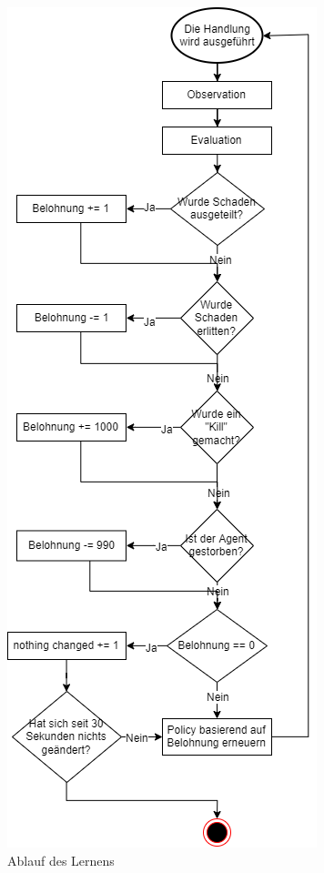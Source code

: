 \begin{figure}[H]
  \centering
  \includegraphics[scale=0.73]{pics/ai/Fluss.png}
  \caption{Ablauf des Lernens}
  \label{fig:maai:fluss}
\end{figure}


